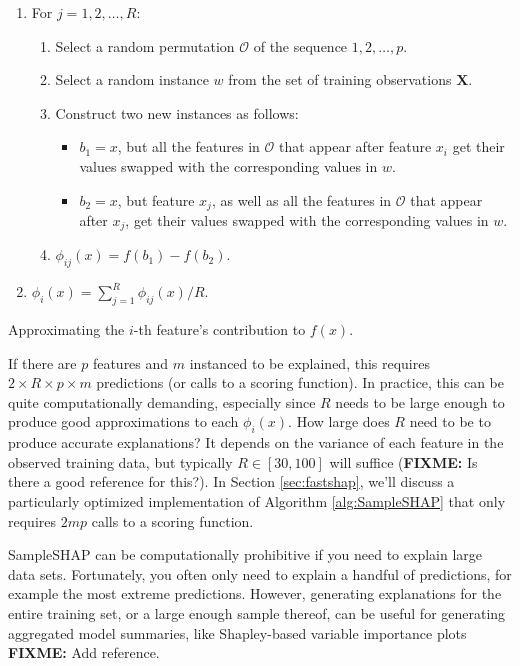 \begin{algorithm}
\begin{enumerate}
  \item For $j = 1, 2, \dots, R$:
  \begin{enumerate}
    \item Select a random permutation $\mathcal{O}$ of the sequence $1, 2, \dots, p$.
    \item Select a random instance $w$ from the set of training observations $\boldsymbol{X}$.
    \item Construct two new instances as follows:
    \begin{itemize}
      \item $b_1 = x$, but all the features in $\mathcal{O}$ that appear after feature $x_i$ get their values swapped with the corresponding values in $w$.
      \item $b_2 = x$, but feature $x_j$, as well as all the features in $\mathcal{O}$ that appear after $x_j$, get their values swapped with the corresponding values in $w$.
    \end{itemize}
    \item $\phi_{ij}\left(x\right) = f\left(b_1\right) - f\left(b_2\right)$.
  \end{enumerate}
  \item $\phi_i\left(x\right) = \sum_{j = 1} ^ R \phi_{ij}\left(x\right) / R$.
\end{enumerate}
\caption{Approximating the $i$-th feature's contribution to $f\left(x\right)$. \label{alg:SampleSHAP}}
\end{algorithm}

If there are \(p\) features and \(m\) instanced to be explained, this
requires \(2 \times R \times p \times m\) predictions (or calls to a
scoring function). In practice, this can be quite computationally
demanding, especially since \(R\) needs to be large enough to produce
good approximations to each \(\phi_i\left(x\right)\). How large does
\(R\) need to be to produce accurate explanations? It depends on the
variance of each feature in the observed training data, but typically
\(R \in \left[30, 100\right]\) will suffice (\textbf{FIXME:} Is there a
good reference for this?). In Section \ref{sec:fastshap}, we'll discuss
a particularly optimized implementation of Algorithm
\ref{alg:SampleSHAP} that only requires \(2mp\) calls to a scoring
function.

SampleSHAP can be computationally prohibitive if you need to explain
large data sets. Fortunately, you often only need to explain a handful
of predictions, for example the most extreme predictions. However,
generating explanations for the entire training set, or a large enough
sample thereof, can be useful for generating aggregated model summaries,
like Shapley-based variable importance plots \textbf{FIXME:} Add
reference.

